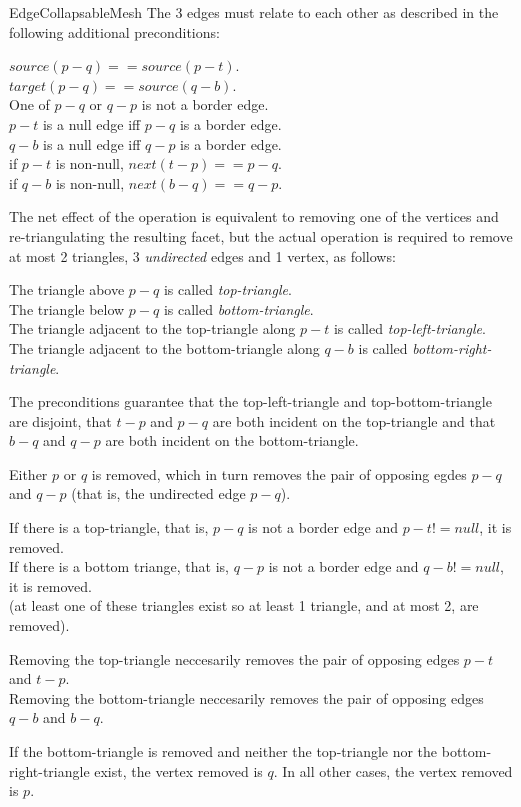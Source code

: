 \begin{ccRefConcept}{EdgeCollapsableMesh}
The 3 edges must relate to each other as described in the following additional preconditions:

$source(p-q)==source(p-t)$.\\
$target(p-q)==source(q-b)$.\\
One of $p-q$ or $q-p$ is not a border edge.\\
$p-t$ is a null edge iff $p-q$ is a border edge.\\
$q-b$ is a null edge iff $q-p$ is a border edge.\\
if $p-t$ is non-null, $next(t-p)==p-q$.\\
if $q-b$ is non-null, $next(b-q)==q-p$.

The net effect of the operation is equivalent to removing one of the vertices
and re-triangulating the resulting facet, but the actual operation is 
required to remove at most 2 triangles, 3 {\em undirected} edges and 1 vertex, 
as follows:

The triangle above $p-q$ is called {\em top-triangle}.\\
The triangle below $p-q$ is called {\em bottom-triangle}.\\
The triangle adjacent to the top-triangle along $p-t$ is called {\em top-left-triangle}.\\
The triangle adjacent to the bottom-triangle along $q-b$ is called {\em bottom-right-triangle}.

The preconditions guarantee that the top-left-triangle and top-bottom-triangle
are disjoint, that $t-p$ and $p-q$ are both incident on the top-triangle and that
$b-q$ and $q-p$ are both incident on the bottom-triangle.
      
Either $p$ or $q$ is removed, which in turn removes the pair of opposing egdes 
$p-q$ and $q-p$ (that is, the undirected edge $p-q$).

If there is a top-triangle, that is, $p-q$ is not a border edge and $p-t!=null$, it is removed.\\
If there is a bottom triange, that is, $q-p$ is not a border edge and $q-b!=null$, it is removed.\\
(at least one of these triangles exist so at least 1 triangle, and at most 2, are removed).
  
Removing the top-triangle neccesarily removes the pair of opposing edges $p-t$ and $t-p$.\\
Removing the bottom-triangle neccesarily removes the pair of opposing edges $q-b$ and $b-q$.
      
If the bottom-triangle is removed and neither the top-triangle nor
the bottom-right-triangle exist, the vertex removed is $q$. In all other
cases, the vertex removed is $p$.


\end{ccRefConcept}
